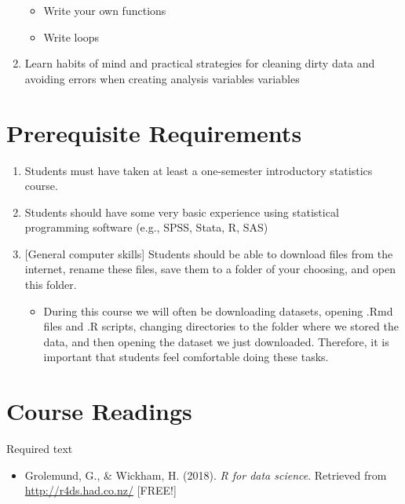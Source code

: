 \documentclass[11pt,]{article}
\providecommand{\tightlist}{%
  \setlength{\itemsep}{0pt}\setlength{\parskip}{0pt}}
\begin{document}
\begin{enumerate}
  \begin{itemize}
  \tightlist
  \item
    Write your own functions
  \item
    Write loops
  \end{itemize}
\item
  Learn habits of mind and practical strategies for cleaning dirty data
  and avoiding errors when creating analysis variables variables
\end{enumerate}

\section{Prerequisite Requirements}\label{prerequisite-requirements}

\begin{enumerate}
\def\labelenumi{\arabic{enumi}.}
\tightlist
\item
  Students must have taken at least a one-semester introductory
  statistics course.\\
\item
  Students should have some very basic experience using statistical
  programming software (e.g., SPSS, Stata, R, SAS)
\item
  {[}General computer skills{]} Students should be able to download
  files from the internet, rename these files, save them to a folder of
  your choosing, and open this folder.

  \begin{itemize}
  \tightlist
  \item
    During this course we will often be downloading datasets, opening
    .Rmd files and .R scripts, changing directories to the folder where
    we stored the data, and then opening the dataset we just downloaded.
    Therefore, it is important that students feel comfortable doing
    these tasks.
  \end{itemize}
\end{enumerate}

\section{Course Readings}\label{course-readings}

Required text

\begin{itemize}
\tightlist
\item
  Grolemund, G., \& Wickham, H. (2018). \emph{R for data science}.
  Retrieved from \url{http://r4ds.had.co.nz/} {[}FREE!{]}
\end{itemize}
\end{document}
